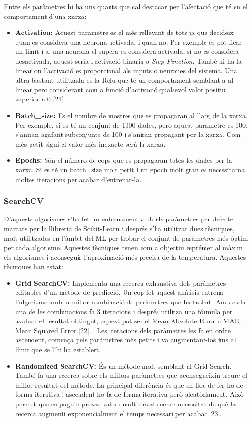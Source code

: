 \documentclass[10pt,a4paper,twocolumn,twoside]{article}
\begin{document}
Entre els paràmetres hi ha uns quants que cal destacar per l'afectació que té en el comportament d'una xarxa:
 \begin{itemize}
\item \textbf{Activation:} Aquest parametre es el més rellevant de tots ja que decideix quan es considera una neurona activada, i quan no. Per exemple es pot ficar un límit i si una neurona el supera es considera activada, si no es considera desactivada, aquest seria l'activació binaria o \textit{Step Function}. També hi ha la linear on l'activació es proporcional als inputs o neurones del sistema. Una altra bastant utilitzada es la Relu que té un comportament semblant a al linear pero considerant com a funció d'activació qualsevol valor positiu superior a 0 [21].
\item \textbf{Batch\_size:} Es el nombre de mostres que es propagaran al llarg de la xarxa. Per exemple, si es té un conjunt de 1000 dades, pero aquest parametre es 100, s'aniran agafant subconjunts de 100 i s'aniran propagant per la xarxa. Com més petit sigui el valor més inexacte serà la xarxa.
\item \textbf{Epochs:} Són el número de cops que es propagaran totes les dades per la xarxa. Si es té un batch\_size molt petit i un epoch molt gran es necessitarna moltes iteracions per acabar d'entrenar-la.
\end{itemize}

\subsubsection{SearchCV}
D'aquests algorismes s'ha fet un entrenament amb els paràmetres per defecte marcats per la llibreria de Scikit-Learn i després s'ha utilitzat dues tècniques, molt utilitzades en l'àmbit del ML per trobar el conjunt de paràmetres més òptim per cada algorisme. Aquestes tècniques tenen com a objectiu esprémer al màxim els algorismes i aconseguir l'aproximació més precisa de la temperatura. Aquestes tècniques han estat:
 \begin{itemize}
\item \textbf{Grid SearchCV:} Implementa una recerca exhaustiva dels paràmetres editables d'un mètode de predicció. Un cop fet aquest anàlisis entrena l'algorisme amb la millor combinació de paràmetres que ha trobat. Amb cada una de les combinacions fa 3 iteracions i després utilitza una fórmula per avaluar el resultat obtingut, aquest pot ser el Mean Absolute Error o MAE, Mean Squared Error [22]... Les iteracions dels paràmetres les fa en ordre ascendent, comença pels paràmetres més petits i va augmentant-los fins al límit que se l'hi ha establert.
\item \textbf{Randomized SearchCV:} És un mètode molt semblant al Grid Search. També fa una recerca sobre els millors paràmetres que aconsegueixin treure el millor resultat del mètode. La principal diferència és que en lloc de fer-ho de forma iterativa i ascendent ho fa de forma iterativa però aleatòriament. Això permet que es puguin provar valors molt elevats sense necessitat de què la recerca augmenti exponencialment el temps necessari per acabar [23].
\end{itemize}
\end{document}
